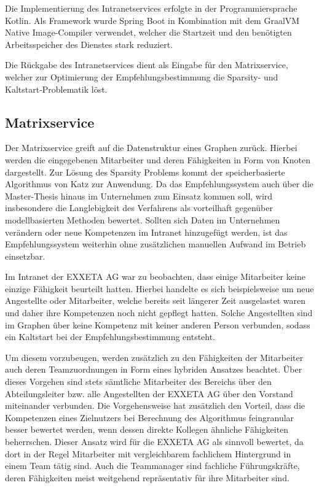 

Die Implementierung des Intranetservices erfolgte in der Programmiersprache Kotlin. Als Framework wurde Spring Boot in Kombination mit dem GraalVM Native Image-Compiler verwendet, welcher die Startzeit und den benötigten Arbeitsspeicher des Dienstes stark reduziert.

Die Rückgabe des Intranetservices dient als Eingabe für den Matrixservice, welcher zur Optimierung der Empfehlungsbestimmung die Sparsity- und Kaltstart-Problematik löst.

\subsection{Matrixservice}
\label{ch:methodik:versuchsaufbau:systemarchitektur:matrixservice}
Der Matrixservice greift auf die Datenstruktur eines Graphen zurück. Hierbei werden die eingegebenen Mitarbeiter und deren Fähigkeiten in Form von Knoten dargestellt. Zur Lösung des Sparsity Problems kommt der speicherbasierte Algorithmus von Katz zur Anwendung. Da das Empfehlungssystem auch über die Master-Thesis hinaus im Unternehmen zum Einsatz kommen soll, wird insbesondere die Langlebigkeit des Verfahrens als vorteilhaft gegenüber modellbasierten Methoden bewertet. Sollten sich Daten im Unternehmen verändern oder neue Kompetenzen im Intranet hinzugefügt werden, ist das Empfehlungssystem weiterhin ohne zusätzlichen manuellen Aufwand im Betrieb einsetzbar.

Im Intranet der EXXETA AG war zu beobachten, dass einige Mitarbeiter keine einzige Fähigkeit beurteilt hatten. Hierbei handelte es sich beispielsweise um neue Angestellte oder Mitarbeiter, welche bereits seit längerer Zeit ausgelastet waren und daher ihre Kompetenzen noch nicht gepflegt hatten. Solche Angestellten sind im Graphen über keine Kompetenz mit keiner anderen Person verbunden, sodass ein Kaltstart bei der Empfehlungsbestimmung entsteht.

Um diesem vorzubeugen, werden zusätzlich zu den Fähigkeiten der Mitarbeiter auch deren Teamzuordnungen in Form eines hybriden Ansatzes beachtet. Über dieses Vorgehen sind stets sämtliche Mitarbeiter des Bereichs \JES über den Abteilungsleiter bzw. alle Angestellten der EXXETA AG über den Vorstand miteinander verbunden. Die Vorgehensweise hat zusätzlich den Vorteil, dass die Kompetenzen eines Zielnutzers bei Berechnung des Algorithmus feingranular besser bewertet werden, wenn dessen direkte Kollegen ähnliche Fähigkeiten beherrschen. Dieser Ansatz wird für die EXXETA AG als sinnvoll bewertet, da dort in der Regel Mitarbeiter mit vergleichbarem fachlichem Hintergrund in einem Team tätig sind. Auch die Teammanager sind fachliche Führungskräfte, deren Fähigkeiten meist weitgehend repräsentativ für ihre Mitarbeiter sind.

